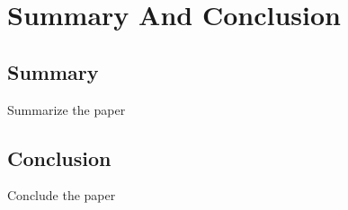 \chapter{Summary And Conclusion}
\label{cha:summary}
\section{Summary}
Summarize the paper
\section{Conclusion}
Conclude the paper
